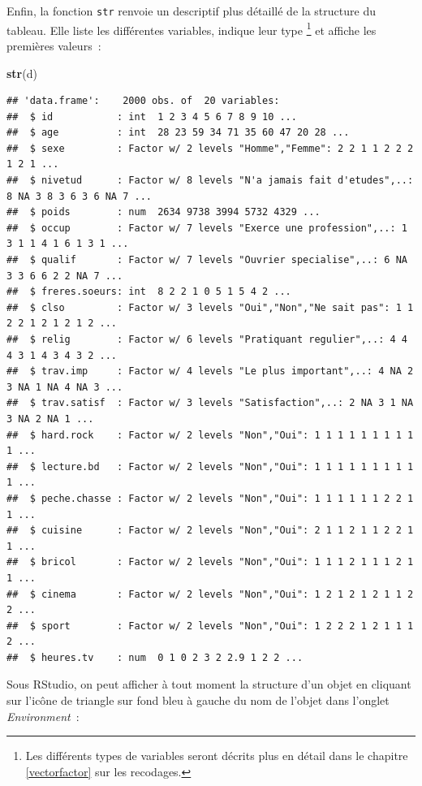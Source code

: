 \documentclass[12pt,]{book}
\newenvironment{Shaded}{\begin{snugshade}}{\end{snugshade}}
\newcommand{\KeywordTok}[1]{\textcolor[rgb]{0.27,0.27,0.27}{\textbf{#1}}}
\newcommand{\NormalTok}[1]{#1}
\begin{document}
Enfin, la fonction \texttt{str} renvoie un descriptif plus détaillé de la structure du tableau. Elle liste les différentes variables, indique leur type \footnote{Les différents types de variables seront décrits plus en détail dans le chapitre \ref{vectorfactor} sur les recodages.} et affiche les premières valeurs~:

\begin{Shaded}
\begin{Highlighting}[]
\KeywordTok{str}\NormalTok{(d)}
\end{Highlighting}
\end{Shaded}

\begin{verbatim}
## 'data.frame':	2000 obs. of  20 variables:
##  $ id           : int  1 2 3 4 5 6 7 8 9 10 ...
##  $ age          : int  28 23 59 34 71 35 60 47 20 28 ...
##  $ sexe         : Factor w/ 2 levels "Homme","Femme": 2 2 1 1 2 2 2 1 2 1 ...
##  $ nivetud      : Factor w/ 8 levels "N'a jamais fait d'etudes",..: 8 NA 3 8 3 6 3 6 NA 7 ...
##  $ poids        : num  2634 9738 3994 5732 4329 ...
##  $ occup        : Factor w/ 7 levels "Exerce une profession",..: 1 3 1 1 4 1 6 1 3 1 ...
##  $ qualif       : Factor w/ 7 levels "Ouvrier specialise",..: 6 NA 3 3 6 6 2 2 NA 7 ...
##  $ freres.soeurs: int  8 2 2 1 0 5 1 5 4 2 ...
##  $ clso         : Factor w/ 3 levels "Oui","Non","Ne sait pas": 1 1 2 2 1 2 1 2 1 2 ...
##  $ relig        : Factor w/ 6 levels "Pratiquant regulier",..: 4 4 4 3 1 4 3 4 3 2 ...
##  $ trav.imp     : Factor w/ 4 levels "Le plus important",..: 4 NA 2 3 NA 1 NA 4 NA 3 ...
##  $ trav.satisf  : Factor w/ 3 levels "Satisfaction",..: 2 NA 3 1 NA 3 NA 2 NA 1 ...
##  $ hard.rock    : Factor w/ 2 levels "Non","Oui": 1 1 1 1 1 1 1 1 1 1 ...
##  $ lecture.bd   : Factor w/ 2 levels "Non","Oui": 1 1 1 1 1 1 1 1 1 1 ...
##  $ peche.chasse : Factor w/ 2 levels "Non","Oui": 1 1 1 1 1 1 2 2 1 1 ...
##  $ cuisine      : Factor w/ 2 levels "Non","Oui": 2 1 1 2 1 1 2 2 1 1 ...
##  $ bricol       : Factor w/ 2 levels "Non","Oui": 1 1 1 2 1 1 1 2 1 1 ...
##  $ cinema       : Factor w/ 2 levels "Non","Oui": 1 2 1 2 1 2 1 1 2 2 ...
##  $ sport        : Factor w/ 2 levels "Non","Oui": 1 2 2 2 1 2 1 1 1 2 ...
##  $ heures.tv    : num  0 1 0 2 3 2 2.9 1 2 2 ...
\end{verbatim}

Sous RStudio, on peut afficher à tout moment la structure d'un objet en cliquant sur l'icône de triangle sur fond bleu à gauche du nom de l'objet dans l'onglet \emph{Environment}~:
\end{document}
